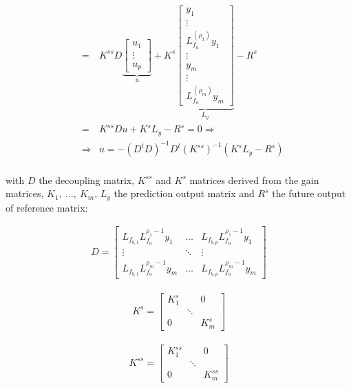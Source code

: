 \documentclass[letterpaper, 10 pt, conference]{ieeeconf}  %
\begin{document}
\begin{eqnarray*}
&=& K^{ss}D
\underbrace{\left[\begin{array}{c}
u_1\\
\vdots\\
u_p
\end{array}\right]}_{u}
+ K^s
\underbrace{\left[\begin{array}{c}
y_1\\
\vdots\\
L_{f_a}^{(\rho_1)}y_1\\
\vdots\\
y_m\\
\vdots\\
L_{f_a}^{(\rho_m)}y_m
\end{array}\right]}_{L_y} - R^s\\
&=& K^{ss}Du + K^sL_y-R^s = 0 \Rightarrow\\
&\Rightarrow& u = -(D^tD)^{-1}D^t(K^{ss})^{-1}(K^sL_y-R^s)\\
\end{eqnarray*}



with $D$ the decoupling matrix, $K^{ss}$ and $K^s$ matrices derived from the gain matrices, $K_1,\ \dots,\ K_m$, $L_y$ the prediction output matrix and $R^s$ the future output of reference matrix:

\begin{eqnarray}
D = 
\left[\begin{array}{ccc}
L_{f_{b,1}}L_{f_a}^{\rho_1-1}y_1 & \dots & L_{f_{b,p}}L_{f_a}^{\rho_1-1}y_1\\
\vdots & \ddots & \vdots\\
L_{f_{b,1}}L_{f_a}^{\rho_m-1}y_m & \dots & L_{f_{b,p}}L_{f_a}^{\rho_m-1}y_m
\end{array}\right]
\end{eqnarray}

\begin{eqnarray}
K^{s} = 
\left[\begin{array}{ccc}
K^{s}_1 & & 0\\
& \ddots &\\
0 & & K^{s}_m
\end{array}\right]
\end{eqnarray}

\begin{eqnarray}
K^{ss} = 
\left[
\begin{array}{ccc}
K^{ss}_1 & & 0\\
& \ddots &\\
0 & & K^{ss}_m
\end{array}\right]
\end{eqnarray}
\end{document}
